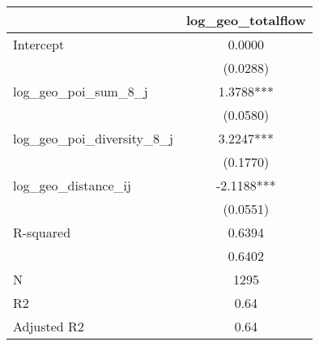 \begin{table}
\caption{}
\begin{center}
\begin{tabular}{lc}
\hline
                               & log\_geo\_totalflow  \\
\midrule
Intercept                      & 0.0000               \\
                               & (0.0288)             \\
log\_geo\_poi\_sum\_8\_j       & 1.3788***            \\
                               & (0.0580)             \\
log\_geo\_poi\_diversity\_8\_j & 3.2247***            \\
                               & (0.1770)             \\
log\_geo\_distance\_ij         & -2.1188***           \\
                               & (0.0551)             \\
R-squared                      & 0.6394               \\
                               & 0.6402               \\
N                              & 1295                 \\
R2                             & 0.64                 \\
Adjusted R2                    & 0.64                 \\
\hline
\end{tabular}
\end{center}
\end{table}